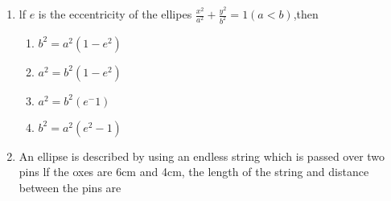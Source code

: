 \begin{enumerate}[label=\thesubsection.\arabic*,ref=\thesubsection.\theenumi]
\item lf $e$ is the eccentricity of the ellipes $\frac{x^2}{a^2}+\frac{y^2}{b^2}=1(a<b)$,then
\begin{enumerate}
\item $b^2=a^2(1-e^2)$
\item $a^2=b^2(1-e^2)$
\item $a^2=b^2(e^-1)$
\item $b^2=a^2(e^2-1)$
\end{enumerate}
\item An ellipse is described by using an endless string which is passed over two pins lf the oxes are 6cm and 4cm, the length of the string and distance between the pins are  \makebox[1cm]{\hrulefill}             
\end{enumerate}
